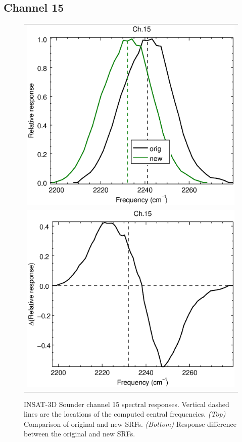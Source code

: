 \subsection{Channel 15}
\begin{figure}[H]
  \centering
  \begin{tabular}{c}
    \includegraphics[scale=0.55]{graphics/sndr/srf/sndr_insat3d-15.eps} \\
    \includegraphics[scale=0.55]{graphics/sndr/srf/sndr_insat3d-15.difference.eps}
  \end{tabular}
  \caption{INSAT-3D Sounder channel 15 spectral responses. Vertical dashed lines are the locations of the computed central frequencies. \emph{(Top)} Comparison of original and new SRFs. \emph{(Bottom)} Response difference between the original and new SRFs.}
  \label{fig:sndr_ch15}
\end{figure}

